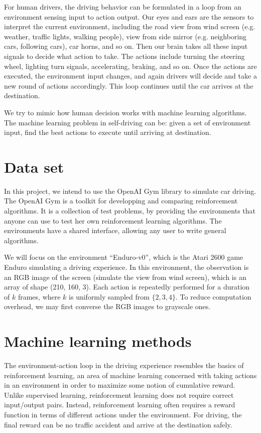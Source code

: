 \documentclass[a4paper]{article}
\begin{document}
For human drivers, the driving behavior can be formulated in a loop from an environment sensing input to action output. Our eyes and ears are the sensors to interpret the current environment, including the road view from wind screen (e.g. weather, traffic lights, walking people), view from side mirror (e.g. neighboring cars, following cars), car horns, and so on. Then our brain takes all these input signals to decide what action to take. The actions include turning the steering wheel, lighting turn signals, accelerating, braking, and so on. Once the actions are executed, the environment input changes, and again drivers will decide and take a new round of actions accordingly. This loop continues until the car arrives at the destination. 

We try to mimic how human decision works with machine learning algorithms. The machine learning problem in self-driving can be: given a set of environment input, find the best actions to execute until arriving at destination.


\section{Data set}

In this project, we intend to use the OpenAI Gym library to simulate car driving.
The OpenAI Gym \cite{gym} is a toolkit for developping and comparing reinforcement algorithms.
It is a collection of test problems, by providing the environments that anyone can
use to test her own reinforcement learning algorithms. The environments have a shared
interface, allowing any user to write general algorithms.

We will focus on the environment ``Enduro-v0'', which is the Atari 2600 game Enduro
simulating a driving experience. In this environment, the observation is an RGB image
of the screen (simulate the view from wind screen), which is an array of shape (210,
160, 3). Each action is repeatedly performed for a duration of $k$ frames, where $k$
is uniformly sampled from $\{2, 3, 4\}$. To reduce computation overhead, we may first
converse the RGB images to grayscale ones.

\section{Machine learning methods}

The environment-action loop in the driving experience resembles the basics of reinforcement
learning, an area of machine learning concerned with taking actions in an environment in
order to maximize some notion of cumulative reward. Unlike supervised learning, reinforcement
learning does not require correct input/output pairs. Instead, reinforcement learning often
requires a reward function in terms of different actions under the environment. For driving,
the final reward can be no traffic accident and arrive at the destination safely.
\end{document}
